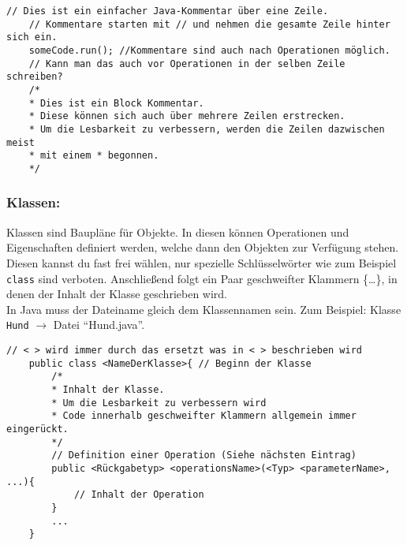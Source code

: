 \begin{lstlisting}[title=\textbf{Beispiel: Kommentare}]
	// Dies ist ein einfacher Java-Kommentar über eine Zeile.
	// Kommentare starten mit // und nehmen die gesamte Zeile hinter sich ein.
	someCode.run(); //Kommentare sind auch nach Operationen möglich.
	// Kann man das auch vor Operationen in der selben Zeile schreiben?
	/*
	* Dies ist ein Block Kommentar.
	* Diese können sich auch über mehrere Zeilen erstrecken.
	* Um die Lesbarkeit zu verbessern, werden die Zeilen dazwischen meist
	* mit einem * begonnen.
	*/
\end{lstlisting}

\begin{Infobox}
	\subsubsection*{Klassen:}
	Klassen sind Baupläne für Objekte.
	In diesen können Operationen und Eigenschaften definiert werden, welche dann den Objekten zur Verfügung stehen.\\
	Diesen kannst du fast frei wählen, nur spezielle Schlüsselwörter wie zum Beispiel \lstinline{class} sind verboten.
	Anschließend folgt ein Paar geschweifter Klammern \{\dots\}, in denen der Inhalt der Klasse geschrieben wird.\\
	In Java muss der Dateiname gleich dem Klassennamen sein. Zum Beispiel: Klasse \lstinline{Hund} $\rightarrow$ Datei \enquote{Hund.java}.
\end{Infobox}

\begin{lstlisting}[title=\textbf{Java Klassen Syntax}]
	// < > wird immer durch das ersetzt was in < > beschrieben wird
	public class <NameDerKlasse>{ // Beginn der Klasse
		/*
		* Inhalt der Klasse.
		* Um die Lesbarkeit zu verbessern wird
		* Code innerhalb geschweifter Klammern allgemein immer eingerückt.
		*/
		// Definition einer Operation (Siehe nächsten Eintrag)
		public <Rückgabetyp> <operationsName>(<Typ> <parameterName>, ...){
			// Inhalt der Operation
		}
		...
	}
\end{lstlisting}

